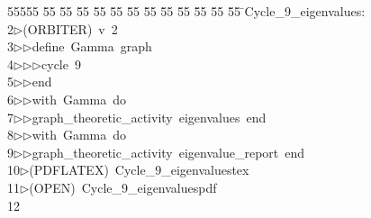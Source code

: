 %
%
\begin{tabbing}
55555 \= 55 \= 55 \= 55 \= 55 \= 55 \= 55 \= 55 \= 55 \= 55 \= 55 \= 55 \= 55 \= \>Cycle\_9\_eigenvalues:\\[0pt]
2\>$\triangleright$\>(ORBITER)\ v\ 2\ \\[0pt]
3\>$\triangleright$\>$\triangleright$\>define\ Gamma\ graph\ \\[0pt]
4\>$\triangleright$\>$\triangleright$\>$\triangleright$\>cycle\ 9\ \\[0pt]
5\>$\triangleright$\>$\triangleright$\>end\ \\[0pt]
6\>$\triangleright$\>$\triangleright$\>with\ Gamma\ do\ \\[0pt]
7\>$\triangleright$\>$\triangleright$\>graph\_theoretic\_activity\ eigenvalues\ end\ \\[0pt]
8\>$\triangleright$\>$\triangleright$\>with\ Gamma\ do\ \\[0pt]
9\>$\triangleright$\>$\triangleright$\>graph\_theoretic\_activity\ eigenvalue\_report\ end\\[0pt]
10\>$\triangleright$\>(PDFLATEX)\ Cycle\_9\_eigenvaluestex\\[0pt]
11\>$\triangleright$\>(OPEN)\ Cycle\_9\_eigenvaluespdf\\[0pt]
12\>\end{tabbing}
